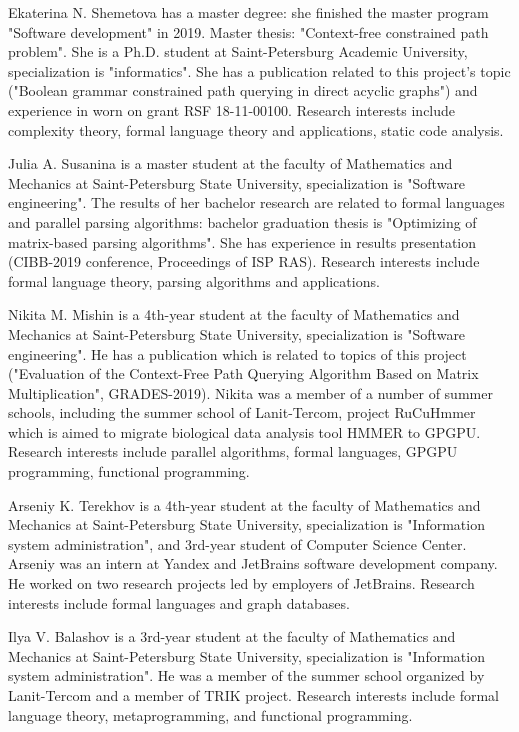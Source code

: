 \documentclass[12pt]{article}  %
\theoremstyle{remark}
\begin{document}
Ekaterina N. Shemetova has a master degree: she finished the master program "Software development" in 2019. Master thesis: "Context-free constrained path problem". She is a Ph.D. student at Saint-Petersburg Academic University, specialization is  "informatics". She has a publication related to this project's topic ("Boolean grammar constrained path querying in direct acyclic graphs") and experience in worn on grant RSF 18-11-00100. Research interests include complexity theory, formal language theory and applications, static code analysis.

Julia A. Susanina is a master student at the faculty of Mathematics and Mechanics at Saint-Petersburg State University, specialization is "Software engineering".
The results of her bachelor research are related to formal languages and parallel parsing algorithms: bachelor graduation thesis is "Optimizing of matrix-based parsing algorithms". She has experience in results presentation (CIBB-2019 conference, Proceedings of ISP RAS). Research interests include formal language theory, parsing algorithms and applications.

Nikita M. Mishin is a 4th-year student at the faculty of Mathematics and Mechanics at Saint-Petersburg State University, specialization is "Software engineering".
He has a publication which is related to topics of this project ("Evaluation of the Context-Free Path Querying Algorithm Based on Matrix Multiplication", GRADES-2019).
Nikita was a member of a number of summer schools, including the summer school of Lanit-Tercom, project RuCuHmmer which is aimed to migrate biological data analysis tool HMMER to GPGPU.
Research interests include parallel algorithms, formal languages, GPGPU programming, functional programming.

Arseniy K. Terekhov is a 4th-year student at the faculty of Mathematics and Mechanics at Saint-Petersburg State University, specialization is "Information system administration", and 3rd-year student of Computer Science Center. Arseniy was an intern at Yandex and JetBrains software development company. He worked on two research projects led by employers of JetBrains. Research interests include formal languages and graph databases.

Ilya V. Balashov is a 3rd-year student at the faculty of Mathematics and Mechanics at Saint-Petersburg State University, specialization is "Information system administration". He was a member of the summer school organized by Lanit-Tercom and a member of TRIK project. Research interests include formal language theory, metaprogramming, and functional programming.
\end{document}
